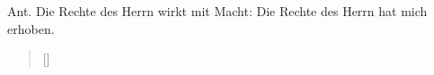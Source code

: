 \medskip

\def\greinitialformat#1{{\fontsize{40}{40}\selectfont #1}}
\gresetfirstlineaboveinitial{\small \textcolor{red}{ Ps 118 b}}{}
\setaboveinitialseparation{0.72mm}


\medskip

\begin{sloppypar}
{\noindent\rm{Ant. Die Rechte des Herrn wirkt mit Macht: Die Rechte des Herrn hat mich erhoben.}}
\end{sloppypar}
\medskip


\begin{verse}[\versewidth]


\end{verse}
